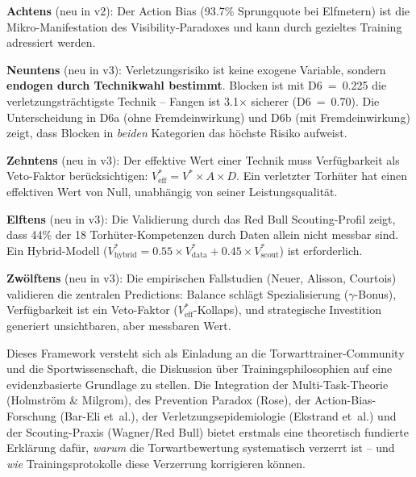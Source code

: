 \documentclass[12pt,a4paper]{article}
\begin{document}
\textbf{Achtens} (neu in v2): Der Action Bias (93.7\% Sprungquote bei Elfmetern) ist die Mikro-Manifestation des Visibility-Paradoxes und kann durch gezieltes Training adressiert werden.

\textbf{Neuntens} (neu in v3): Verletzungsrisiko ist keine exogene Variable, sondern \textbf{endogen durch Technikwahl bestimmt}. Blocken ist mit D6~=~0.225 die verletzungstr\"achtigste Technik -- Fangen ist 3.1$\times$ sicherer (D6~=~0.70). Die Unterscheidung in D6a (ohne Fremdeinwirkung) und D6b (mit Fremdeinwirkung) zeigt, dass Blocken in \emph{beiden} Kategorien das h\"ochste Risiko aufweist.

\textbf{Zehntens} (neu in v3): Der effektive Wert einer Technik muss Verf\"ugbarkeit als Veto-Faktor ber\"ucksichtigen: $V^{*}_{\text{eff}} = V^{*} \times A \times D$. Ein verletzter Torh\"uter hat einen effektiven Wert von Null, unabh\"angig von seiner Leistungsqualit\"at.

\textbf{Elftens} (neu in v3): Die Validierung durch das Red Bull Scouting-Profil \citep{wagner2023scouting} zeigt, dass 44\% der 18 Torh\"uter-Kompetenzen durch Daten allein nicht messbar sind. Ein Hybrid-Modell ($V^{*}_{\text{hybrid}} = 0.55 \times V^{*}_{\text{data}} + 0.45 \times V^{*}_{\text{scout}}$) ist erforderlich.

\textbf{Zw\"olftens} (neu in v3): Die empirischen Fallstudien (Neuer, Alisson, Courtois) validieren die zentralen Predictions: Balance schl\"agt Spezialisierung ($\gamma$-Bonus), Verf\"ugbarkeit ist ein Veto-Faktor ($V^{*}_{\text{eff}}$-Kollaps), und strategische Investition generiert unsichtbaren, aber messbaren Wert.

\vspace{1em}
\noindent Dieses Framework versteht sich als Einladung an die Torwarttrainer-Community und die Sportwissenschaft, die Diskussion \"uber Trainingsphilosophien auf eine evidenzbasierte Grundlage zu stellen. Die Integration der Multi-Task-Theorie (Holmstr\"om \& Milgrom), des Prevention Paradox (Rose), der Action-Bias-Forschung (Bar-Eli et~al.), der Verletzungsepidemiologie (Ekstrand et~al.) und der Scouting-Praxis (Wagner/Red Bull) bietet erstmals eine theoretisch fundierte Erkl\"arung daf\"ur, \emph{warum} die Torwartbewertung systematisch verzerrt ist -- und \emph{wie} Trainingsprotokolle diese Verzerrung korrigieren k\"onnen.


\newpage

\end{document}
